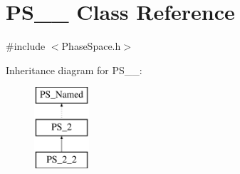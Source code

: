 \hypertarget{classPS__2__2}{\section{P\-S\-\_\-\_ Class Reference}
\label{classPS__2__2}
}


{\ttfamily \#include $<$Phase\-Space.\-h$>$}

Inheritance diagram for P\-S\-\_\-\_\-:\begin{figure}[H]
\begin{center}
\leavevmode
\includegraphics[height=3.000000cm]{classPS__2__2}
\end{center}
\end{figure}
